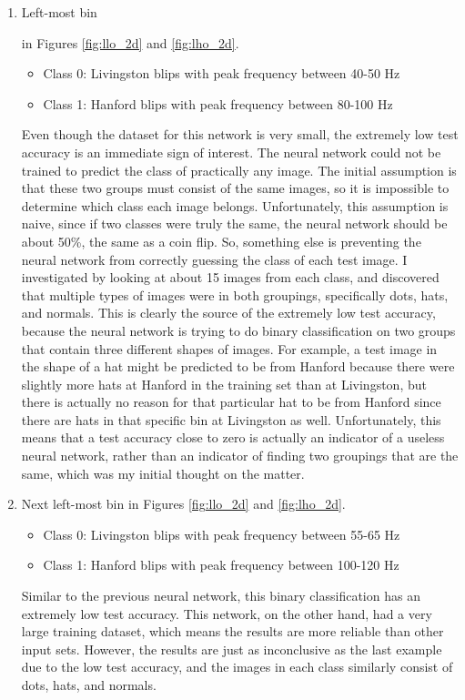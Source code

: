 \documentclass[a4paper]{article}
\begin{document}
\begin{enumerate}
	\item \hypertarget{sup3}{Left-most bin} in Figures \ref{fig:llo_2d} and \ref{fig:lho_2d}.
	\begin{itemize}
		\item Class 0: Livingston blips with peak frequency between 40-50 Hz
		\item Class 1: Hanford blips with peak frequency between 80-100 Hz
	\end{itemize} Even though the dataset for this network is very small, the extremely low test accuracy is an immediate sign of interest. The neural network could not be trained to predict the class of practically any image. The initial assumption is that these two groups must consist of the same images, so it is impossible to determine which class each image belongs. Unfortunately, this assumption is naive, since if two classes were truly the same, the neural network should be about 50\%, the same as a coin flip. So, something else is preventing the neural network from correctly guessing the class of each test image. I investigated by looking at about 15 images from each class, and discovered that multiple types of images were in both groupings, specifically dots, hats, and normals. This is clearly the source of the extremely low test accuracy, because the neural network is trying to do binary classification on two groups that contain three different shapes of images. For example, a test image in the shape of a hat might be predicted to be from Hanford because there were slightly more hats at Hanford in the training set than at Livingston, but there is actually no reason for that particular hat to be from Hanford since there are hats in that specific bin at Livingston as well. Unfortunately, this means that a test accuracy close to zero is actually an indicator of a useless neural network, rather than an indicator of finding two groupings that are the same, which was my initial thought on the matter. 
	
	\item Next left-most bin in Figures \ref{fig:llo_2d} and \ref{fig:lho_2d}.
	\begin{itemize}
		\item Class 0: Livingston blips with peak frequency between 55-65 Hz
		\item Class 1: Hanford blips with peak frequency between 100-120 Hz
	\end{itemize} Similar to the previous neural network, this binary classification has an extremely low test accuracy. This network, on the other hand, had a very large training dataset, which means the results are more reliable than other input sets. However, the results are just as inconclusive as the last example due to the low test accuracy, and the images in each class similarly consist of dots, hats, and normals.


\end{enumerate}
\end{document}
